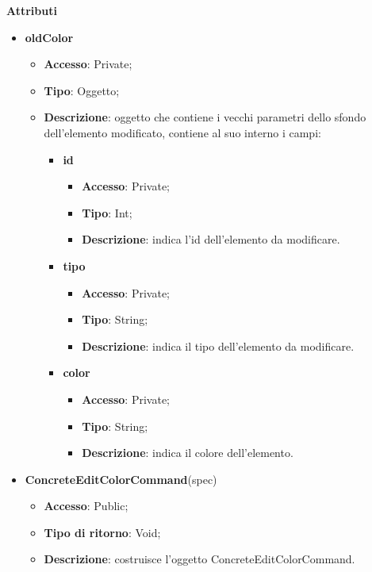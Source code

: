 {{{			\textbf{Attributi}
			\begin{itemize}
				\item \textbf{oldColor}
				\begin{itemize}
				\item \textbf{Accesso}: Private;
				\item \textbf{Tipo}: Oggetto;
				\item \textbf{Descrizione}: oggetto che contiene i vecchi parametri dello sfondo dell'elemento modificato, contiene al suo interno i campi:
				\begin{itemize}
				\item \textbf{id}
				\begin{itemize}
					\item \textbf{Accesso}: Private;
					\item \textbf{Tipo}: Int;
					\item \textbf{Descrizione}: indica l'id dell’elemento da modificare.
				\end{itemize}
				\item \textbf{tipo}
				\begin{itemize}
					\item \textbf{Accesso}: Private;
					\item \textbf{Tipo}: String;
					\item \textbf{Descrizione}: indica il tipo dell’elemento da modificare.
				\end{itemize}
				\item \textbf{color}
				\begin{itemize}
					\item \textbf{Accesso}: Private;
					\item \textbf{Tipo}: String;
					\item \textbf{Descrizione}: indica il colore dell’elemento.
				\end{itemize}
			\end{itemize}
				\end{itemize}
				\end{itemize}
			\begin{itemize}
				\item \textbf{ConcreteEditColorCommand}(spec)
				\begin{itemize}
					\item \textbf{Accesso}: Public;
					\item \textbf{Tipo di ritorno}: Void;
					\item \textbf{Descrizione}: costruisce l’oggetto ConcreteEditColorCommand.

\end{itemize}
\end{itemize}}}}
